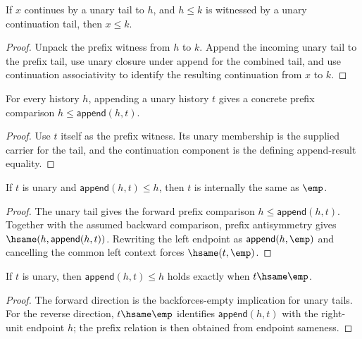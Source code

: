 \begin{theorem}
\label{thm:preorder-prefix-left-extension}
If \(x\) continues by a unary tail to \(h\), and \(h\le k\) is witnessed by a
unary continuation tail, then \(x\le k\).
\end{theorem}
\begin{proof}
Unpack the prefix witness from \(h\) to \(k\). Append the incoming unary tail to
the prefix tail, use unary closure under append for the combined tail, and use
continuation associativity to identify the resulting continuation from \(x\) to
\(k\).
\end{proof}

\begin{theorem}
\label{thm:preorder-prefix-append-tail}
For every history \(h\), appending a unary history \(t\) gives a concrete
prefix comparison \(h \le \mathsf{append}(h,t)\).
\end{theorem}
\begin{proof}
Use \(t\) itself as the prefix witness. Its unary membership is the supplied
carrier for the tail, and the continuation component is the defining
append-result equality.
\end{proof}

\begin{theorem}
\label{thm:preorder-prefix-append-tail-backforces-empty}
If \(t\) is unary and \(\mathsf{append}(h,t)\le h\), then \(t\) is internally
the same as \(\emp\).
\end{theorem}
\begin{proof}
The unary tail gives the forward prefix comparison
\(h\le\mathsf{append}(h,t)\). Together with the assumed backward comparison,
prefix antisymmetry gives \(\hsame(h,\mathsf{append}(h,t))\). Rewriting the
left endpoint as \(\mathsf{append}(h,\emp)\) and cancelling the common left
context forces \(\hsame(t,\emp)\).
\end{proof}

\begin{theorem}
\label{thm:preorder-prefix-append-tail-backforces-empty-iff}
If \(t\) is unary, then \(\mathsf{append}(h,t)\le h\) holds exactly when
\(t\hsame\emp\).
\end{theorem}
\begin{proof}
The forward direction is the backforces-empty implication for unary tails. For
the reverse direction, \(t\hsame\emp\) identifies
\(\mathsf{append}(h,t)\) with the right-unit endpoint \(h\); the prefix
relation is then obtained from endpoint sameness.
\end{proof}

